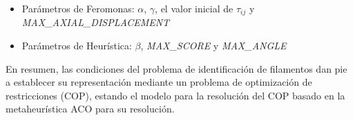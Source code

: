 
\begin{itemize}
    \item Par\'ametros de Feromonas: $\alpha$, $\gamma$, el valor inicial de $\tau_{ij}$ y {\it MAX\_AXIAL\_DISPLACEMENT}
    \item Par\'ametros de Heur\'istica: $\beta$, {\it MAX\_SCORE} y {\it MAX_ANGLE}
\end{itemize}


En resumen, las condiciones del problema de identificaci\'on de filamentos dan pie a establecer su representaci\'on mediante un problema de optimizaci\'on de restricciones (COP), estando el modelo para la resoluci\'on del COP basado en la metaheur\'istica ACO para su resoluci\'on.